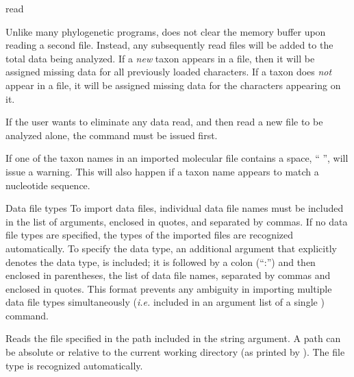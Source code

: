 \begin{command}{read}{}
\begin{poydescription}
        \begin{statement}
            Unlike many phylogenetic programs, \poy does not clear the memory
            buffer upon reading a second file. Instead, any subsequently read files
            will be added to the total data being analyzed.  If a \emph{new} taxon
            appears in a file, then it will be assigned missing data for all
            previously loaded characters. If a taxon does \emph{not} appear in a
            file, it will be assigned missing data for the characters appearing on
            it. 
            
            If the user wants to eliminate any data read, and then read a new file
            to be analyzed alone, the  command must be issued
            first. 
        \end{statement}
        
        \begin{statement}
             If one of the taxon names in an imported molecular file contains
             a space, `` '', \poy will issue a warning. This will also happen if a
             taxon name appears to match a nucleotide sequence.
        \end{statement}
	\end{poydescription}

	\begin{arguments}

	  \begin{argumentgroup}{Data file types}
	  To import data files, individual data file names must be included in the list of
	   arguments, enclosed in quotes, and separated
	  by commas. If no data file types are specified, the types of the imported
	  files are recognized automatically. To specify the data type,
	  an additional argument that explicitly denotes the data type,
	  is included; it is followed by a colon (``:'') and then enclosed in parentheses, the
	  list of data file names, separated by commas and enclosed in quotes. This
	  format prevents any ambiguity in importing multiple data file types
	  simultaneously (\emph{i.e.} included in an argument list of a single )
	  command.

              {Reads the file specified in the path included in the string argument.
              A path can be absolute or relative to the current
              working directory (as printed by ). The file type
              is recognized automatically.

}
\end{argumentgroup}
\end{arguments}
\end{command}
